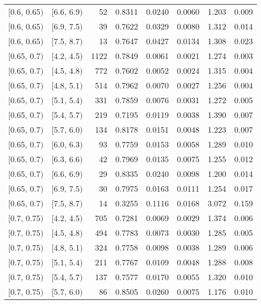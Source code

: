 \begin{longtable}{| l | l | r | r | r | r | r | r |}
        $[$0.6, 0.65$)$ & $[$6.6, 6.9$)$ & 52 & 0.8311 & 0.0240 & 0.0060 & 1.203 & 0.009 \\
        $[$0.6, 0.65$)$ & $[$6.9, 7.5$)$ & 39 & 0.7622 & 0.0329 & 0.0080 & 1.312 & 0.014 \\
        $[$0.6, 0.65$)$ & $[$7.5, 8.7$)$ & 13 & 0.7647 & 0.0427 & 0.0134 & 1.308 & 0.023 \\
        $[$0.65, 0.7$)$ & $[$4.2, 4.5$)$ & 1122 & 0.7849 & 0.0061 & 0.0021 & 1.274 & 0.003 \\
        $[$0.65, 0.7$)$ & $[$4.5, 4.8$)$ & 772 & 0.7602 & 0.0052 & 0.0024 & 1.315 & 0.004 \\
        $[$0.65, 0.7$)$ & $[$4.8, 5.1$)$ & 514 & 0.7962 & 0.0070 & 0.0027 & 1.256 & 0.004 \\
        $[$0.65, 0.7$)$ & $[$5.1, 5.4$)$ & 331 & 0.7859 & 0.0076 & 0.0031 & 1.272 & 0.005 \\
        $[$0.65, 0.7$)$ & $[$5.4, 5.7$)$ & 219 & 0.7195 & 0.0119 & 0.0038 & 1.390 & 0.007 \\
        $[$0.65, 0.7$)$ & $[$5.7, 6.0$)$ & 134 & 0.8178 & 0.0151 & 0.0048 & 1.223 & 0.007 \\
        $[$0.65, 0.7$)$ & $[$6.0, 6.3$)$ & 93 & 0.7759 & 0.0153 & 0.0058 & 1.289 & 0.010 \\
        $[$0.65, 0.7$)$ & $[$6.3, 6.6$)$ & 42 & 0.7969 & 0.0135 & 0.0075 & 1.255 & 0.012 \\
        $[$0.65, 0.7$)$ & $[$6.6, 6.9$)$ & 29 & 0.8335 & 0.0240 & 0.0098 & 1.200 & 0.014 \\
        $[$0.65, 0.7$)$ & $[$6.9, 7.5$)$ & 30 & 0.7975 & 0.0163 & 0.0111 & 1.254 & 0.017 \\
        $[$0.65, 0.7$)$ & $[$7.5, 8.7$)$ & 14 & 0.3255 & 0.1116 & 0.0168 & 3.072 & 0.159 \\
        $[$0.7, 0.75$)$ & $[$4.2, 4.5$)$ & 705 & 0.7281 & 0.0069 & 0.0029 & 1.374 & 0.006 \\
        $[$0.7, 0.75$)$ & $[$4.5, 4.8$)$ & 494 & 0.7783 & 0.0073 & 0.0030 & 1.285 & 0.005 \\
        $[$0.7, 0.75$)$ & $[$4.8, 5.1$)$ & 324 & 0.7758 & 0.0098 & 0.0038 & 1.289 & 0.006 \\
        $[$0.7, 0.75$)$ & $[$5.1, 5.4$)$ & 211 & 0.7767 & 0.0109 & 0.0048 & 1.288 & 0.008 \\
        $[$0.7, 0.75$)$ & $[$5.4, 5.7$)$ & 137 & 0.7577 & 0.0170 & 0.0055 & 1.320 & 0.010 \\
        $[$0.7, 0.75$)$ & $[$5.7, 6.0$)$ & 86 & 0.8505 & 0.0260 & 0.0075 & 1.176 & 0.010 \\

\end{longtable}
